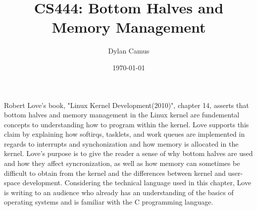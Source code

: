 \documentclass[letterpaper,10pt]{article}
\title{CS444: Bottom Halves and Memory Management}
\author{Dylan Camus}
\date{\today}
\begin{document}
\maketitle
Robert Love's book, "Linux Kernel Development(2010)", chapter 14, asserts that bottom halves and memory management in the Linux kernel are fundemental concepts to understanding how to program within the kernel. Love supports this claim by explaining how softirqs, tasklets, and work queues are implemented in regards to interrupts and synchonization and how memory is allocated in the kernel. Love's purpose is to give the reader a sense of why bottom halves are used and how they affect syncronization, as well as how memory can sometimes be difficult to obtain from the kernel and the differences between kernel and user-space development. Considering the technical language used in this chapter, Love is writing to an audience who already has an understanding of the basics of operating systems and is familiar with the C programming language.
\end{document}
